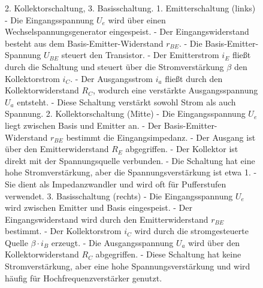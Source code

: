 {\begin{figure}[H]
\begin{minipage}[b]{0.33\textwidth}
{        2. Kollektorschaltung,  
        3. Basisschaltung.  
        1. Emitterschaltung (links)
        - Die Eingangsspannung \( U_e \) wird über einen Wechselspannungsgenerator eingespeist.  
        - Der Eingangswiderstand besteht aus dem Basis-Emitter-Widerstand \( r_{BE} \).  
        - Die Basis-Emitter-Spannung \( U_{BE} \) steuert den Transistor.  
        - Der Emitterstrom \( i_E \) fließt durch die Schaltung und steuert über die Stromverstärkung \( \beta \) den Kollektorstrom \( i_C \).  
        - Der Ausgangsstrom \( i_a \) fließt durch den Kollektorwiderstand \( R_C \), wodurch eine verstärkte Ausgangsspannung \( U_a \) entsteht.  
        - Diese Schaltung verstärkt sowohl Strom als auch Spannung.  
        2. Kollektorschaltung (Mitte)
        - Die Eingangsspannung \( U_e \) liegt zwischen Basis und Emitter an.  
        - Der Basis-Emitter-Widerstand \( r_{BE} \) bestimmt die Eingangsimpedanz.  
        - Der Ausgang ist über den Emitterwiderstand \( R_E \) abgegriffen.  
        - Der Kollektor ist direkt mit der Spannungsquelle verbunden.  
        - Die Schaltung hat eine hohe Stromverstärkung, aber die Spannungsverstärkung ist etwa 1.  
        - Sie dient als Impedanzwandler und wird oft für Pufferstufen verwendet.  
        3. Basisschaltung (rechts)
        - Die Eingangsspannung \( U_e \) wird zwischen Emitter und Basis eingespeist.  
        - Der Eingangswiderstand wird durch den Emitterwiderstand \( r_{BE} \) bestimmt.  
        - Der Kollektorstrom \( i_C \) wird durch die stromgesteuerte Quelle \( \beta \cdot i_B \) erzeugt.  
        - Die Ausgangsspannung \( U_a \) wird über den Kollektorwiderstand \( R_C \) abgegriffen.  
        - Diese Schaltung hat keine Stromverstärkung, aber eine hohe Spannungsverstärkung und wird häufig für Hochfrequenzverstärker genutzt.}
    \end{minipage}
    \begin{minipage}[b]{0.33\textwidth}
        \centering
        
\end{minipage}
\end{figure}}
